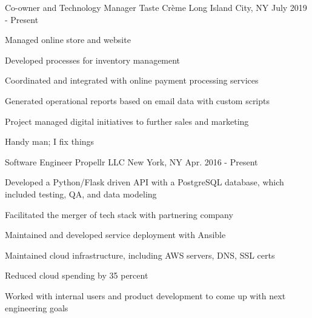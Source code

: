 


\begin{cventries}


\cventry
{Co-owner and Technology Manager} %
{Taste Crème} %
{Long Island City, NY} %
{July 2019 - Present} %
{ %
\begin{cvitems}
\item {Managed online store and website}
\item {Developed processes for inventory management}
\item {Coordinated and integrated with online payment processing services}
\item {Generated operational reports based on email data with custom scripts}
\item {Project managed digital initiatives to further sales and marketing}
\item {Handy man; I fix things}
\end{cvitems}
\bigskip
}


\cventry
{Software Engineer} %
{Propellr LLC} %
{New York, NY} %
{Apr. 2016 - Present} %
{ %
\begin{cvitems}
\item {Developed a Python/Flask driven API with a PostgreSQL database, which included testing, QA, and data modeling}
\item {Facilitated the merger of tech stack with partnering company}
\item {Maintained and developed service deployment with Ansible}
\item {Maintained cloud infrastructure, including AWS servers, DNS, SSL certs}
\item {Reduced cloud spending by 35 percent}
\item {Worked with internal users and product development to come up with next engineering goals}
\end{cvitems}
\bigskip
}


\end{cventries}
